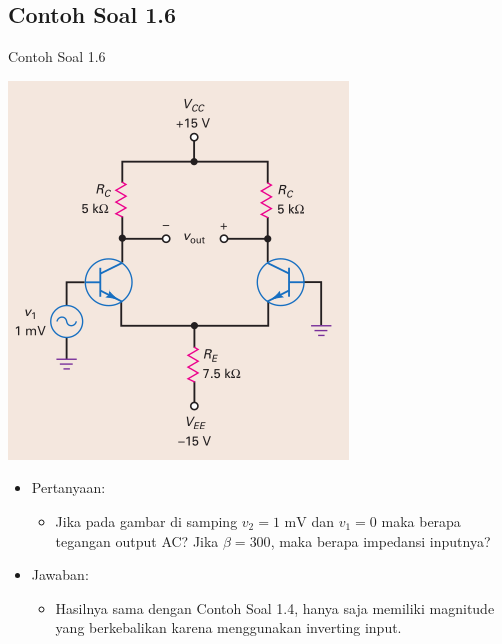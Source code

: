 \documentclass[aspectratio=169]{beamer}
\begin{document}
\subsection{Contoh Soal 1.6}
\begin{frame}{Contoh Soal 1.6}
	\begin{multicols}{2}
		\begin{center}
			\includegraphics[height=0.7\textheight]{gambar/01.contoh_soal_1-2}
		\end{center}
		\columnbreak
		\begin{itemize}
			\item Pertanyaan:
			\begin{itemize}
				\item Jika pada gambar di samping $ v_2 = 1 \text{ mV} $ dan $ v_1 = 0 $ maka berapa tegangan output AC? Jika $ \beta = 300 $, maka berapa impedansi inputnya?
			\end{itemize}
			\item Jawaban:
			\begin{itemize}
				\item Hasilnya sama dengan Contoh Soal 1.4, hanya saja memiliki magnitude yang berkebalikan karena menggunakan inverting input.
			\end{itemize}
		\end{itemize}
	\end{multicols}
\end{frame}
\end{document}

